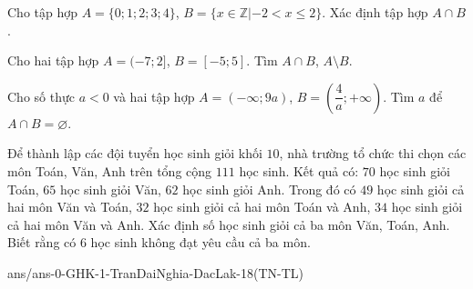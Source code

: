 \begin{bt}%
	Cho tập hợp $A=\{0;1;2;3;4\}$, $B=\{x \in \mathbb{Z}| -2 < x \le 2\}$. Xác định tập hợp $A \cap B$.
\end{bt}

\begin{bt}%
	Cho hai tập hợp $A=(-7;2]$, $B=[-5;5]$. Tìm $A \cap B$, $A \setminus B$.
\end{bt}

\begin{bt}%
	Cho số thực $a < 0$ và hai tập hợp $A=(-\infty; 9a)$, $B=\left(\dfrac{4}{a}; +\infty\right)$. Tìm $a$ để $A \cap B = \varnothing$.
\end{bt}

\begin{bt}%
	Để thành lập các đội tuyển học sinh giỏi khối $10$, nhà trường tổ chức thi chọn các môn Toán, Văn, Anh trên tổng cộng $111$ học sinh. Kết quả có: $70$ học sinh giỏi Toán, $65$ học sinh giỏi Văn, $62$ học sinh giỏi Anh. Trong đó có $49$ học sinh giỏi cả hai môn Văn và Toán, $32$ học sinh giỏi cả hai môn Toán và Anh, $34$ học sinh giỏi cả hai môn Văn và Anh. Xác định số học sinh giỏi cả ba môn Văn, Toán, Anh. Biết rằng có $6$ học sinh không đạt yêu cầu cả ba môn.
\end{bt}


\begin{indapan}{10}
{ans/ans-0-GHK-1-TranDaiNghia-DacLak-18(TN-TL)}
\end{indapan}